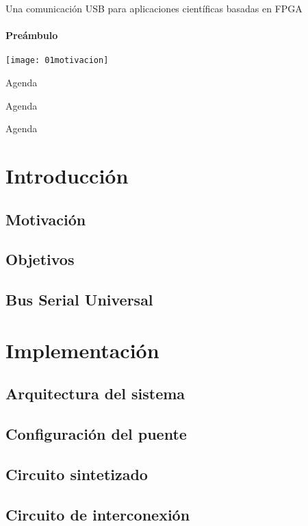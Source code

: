 \documentclass[11pt,a4paper]{beamer}
\begin{document}
	\titlepage
	\begin{frame}[c]{Una comunicación USB para aplicaciones científicas basadas en FPGA}
		\framesubtitle{Preámbulo}
		\centering
		\texttt{[image: 01motivacion]}
	\end{frame}
	\begin{frame}{Agenda}
		\tableofcontents[hideallsubsections]
	\end{frame}
	\begin{frame}{Agenda}
		\tableofcontents[sections={1,2}]
	\end{frame}
	\begin{frame}{Agenda}
		\tableofcontents[sections={3,4}]
	\end{frame}
	\section{Introducción}{
		\subsection{Motivación}
			
		\subsection{Objetivos}
			
		\subsection{Bus Serial Universal}
			}
	\section{Implementación}
		\subsection{Arquitectura del sistema}
			
		\subsection{Configuración del puente}
			
		\subsection{Circuito sintetizado}
			
		\subsection{Circuito de interconexión}
			
\end{document}
